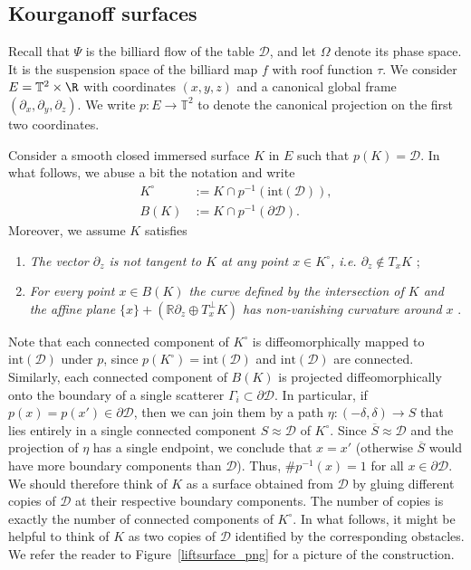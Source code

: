 \documentclass[reqno,11pt]{amsart}
\begin{document}
\subsection{Kourganoff surfaces}
Recall that \( \Psi \) is the billiard flow of the table \( \mathcal{D} \), and let \( \Omega \) denote its phase space.
It is the suspension space of the billiard map \( f \) with roof function \( \tau \).
We consider \( E= \mathbb{T}^2\times \R \) with coordinates \( (x,y,z) \) and a canonical global frame \( (\partial_x, \partial_y, \partial_z) \).
We write \( p\colon E \to \mathbb{T}^2 \) to denote the canonical projection on the first two coordinates.
\par Consider a smooth closed immersed surface \( K \) in \( E \) such that \( p(K) = \mathcal{D} \). 
In what follows, we abuse a bit the notation and write
\begin{align*}
    K^\circ &:= K \cap p^{-1}(\mathrm{int}(\mathcal{D})), \\
    B(K)&:= K \cap p^{-1}(\partial\mathcal{D}).
\end{align*}
Moreover, we assume \( K \) satisfies
\begin{enumerate}
    \item[(K1)]\label{cond_k_un} \emph{
        The vector \( \partial_z \) is not tangent to \( K \) at any point \( x \in K^\circ \), i.e. \( \partial_z \notin T_xK \)
        };
    \item[(K2)] \emph{
        For every point \( x \in B(K) \) the curve defined by the intersection of \( K \) and the affine plane \( \{x\} + (\mathbb{R}\partial_z \oplus T^\perp_xK) \) has non-vanishing curvature around \( x \)
        }.
\end{enumerate}
\par Note that each connected component of \( K^\circ \) is diffeomorphically mapped to \( \mathrm{int}(\mathcal{D}) \) under \( p \), since \( p(K^\circ) = \mathrm{int}(\mathcal{D}) \) and \( \mathrm{int}(\mathcal{D}) \) are connected.
Similarly, each connected component of \( B(K) \) is projected diffeomorphically onto the boundary of a single scatterer \( \Gamma_i \subset \partial\mathcal{D} \).
In particular, if \( p(x) = p(x') \in \partial \mathcal{D} \), then we can join them by a path \( \eta\colon (-\delta, \delta) \to S \) that lies entirely in a single connected component \( S \approx \mathcal{D} \) of \( K^\circ \).
Since \( \overline{S} \approx \mathcal{D} \) and the projection of \( \eta \) has a single endpoint, we conclude that \( x = x' \) (otherwise \( \overline{S} \) would have more boundary components than \( \mathcal{D} \)).
Thus, \( \#p^{-1}(x) = 1 \) for all \( x \in \partial \mathcal{D} \). 
We should therefore think of \( K \) as a surface obtained from \( \mathcal{D} \) by gluing different copies of \( \mathcal{D} \) at their respective boundary components. 
The number of copies is exactly the number of connected components of \( K^\circ \).
In what follows, it might be helpful to think of \( K \) as two copies of \( \mathcal{D} \) identified by the corresponding obstacles. We refer the reader to Figure~\ref{liftsurface_png} for a picture of the construction. 
\end{document}
